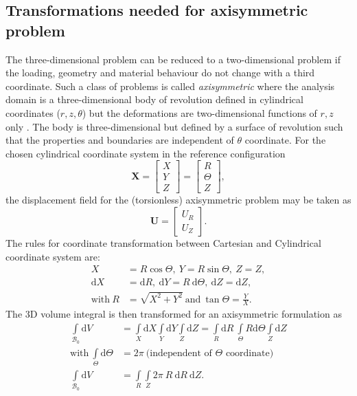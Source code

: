 \documentclass[11pt,a4paper,final]{article}
\begin{document}
\subsection{Transformations needed for axisymmetric problem}
The three-dimensional problem can be reduced to a two-dimensional problem if the loading, geometry and material behaviour do not change with a third coordinate. Such a class of problems is called \textit{axisymmetric} where the analysis domain is a three-dimensional body of revolution defined in cylindrical coordinates ($r, z, \theta$) but the deformations are two-dimensional functions of $r, z$ only \cite{Zienkiewicz2013}. The body is three-dimensional but defined by a surface of revolution such that the properties and boundaries are independent of $\theta$ coordinate. For the chosen cylindrical coordinate system in the reference configuration
\begin{equation}
\mathbf{X} = \begin{bmatrix}
X \\
Y \\
Z
\end{bmatrix} = \begin{bmatrix}
R \\
\Theta \\
Z
\end{bmatrix},
\end{equation}
the displacement field for the (torsionless) axisymmetric problem may be taken as 
\begin{equation}
\mathbf{U} = \begin{bmatrix}
U_R \\
U_Z
\end{bmatrix}.
\label{eq:1.25}
\end{equation}
The rules for coordinate transformation between Cartesian and Cylindrical coordinate system are:
\begin{align}
X &= R \cos \Theta, \ Y = R \sin \Theta, \ Z = Z, \nonumber \\
\mathrm{d}X &= \mathrm{d}R, \ \mathrm{d}Y = R \ \mathrm{d} \Theta, \ \mathrm{d}Z = \mathrm{d}Z, \nonumber \\
\text{with} \ R &= \sqrt{X^2 + Y^2} \ \text{and} \ \tan \Theta = \frac{Y}{X}.
\end{align}
The 3D volume integral is then transformed for an axisymmetric formulation as
\begin{align}
\int\limits_{\mathcal{B}_0} \mathrm{d} V &= \int\limits_{X} \mathrm{d} X \int\limits_{Y} \mathrm{d} Y \int\limits_{Z} \mathrm{d} Z = \int\limits_{R} \mathrm{d} R \ \int\limits_{\Theta} R \mathrm{d} \Theta \int\limits_{Z} \mathrm{d} Z \nonumber \\
\text{with} \ \int\limits_{\Theta} \mathrm{d} \Theta &= 2 \pi \ \text{(independent of $\Theta$ coordinate)} \nonumber \\
\int\limits_{\mathcal{B}_0} \mathrm{d} V &= \int\limits_{R} \int\limits_{Z} 2 \pi \ R \ \mathrm{d} R \ \mathrm{d} Z. 
\end{align}
\end{document}

